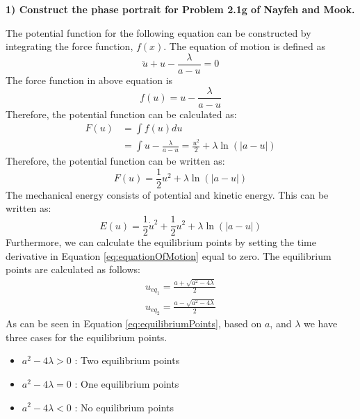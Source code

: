 \documentclass[12pt, a4paper]{extreport}
\begin{document}
\begin{flushleft}
{\large\textbf{1) Construct the phase portrait for Problem 2.1g of Nayfeh and Mook.}}
\end{flushleft}

The potential function for the following equation can be constructed by integrating the force function, $f(x)$. The equation of motion is defined as
%
\begin{equation}\label{eq:equationOfMotion}
	\ddot{u} + u - \frac{\lambda}{a - u} = 0
\end{equation}
%
The force function in above equation is
%
\begin{equation}
	f(u) = u - \frac{\lambda}{a - u}
\end{equation}
%
Therefore, the potential function can be calculated as:
%
\begin{subequations}
\begin{align*}
	F(u) &= \int f(u) du \\
		&= \int u - \frac{\lambda}{a - u} = \frac{u^2}{2} + \lambda \ln \left( |a - u| \right)
\end{align*}
\end{subequations}
%
Therefore, the potential function can be written as:
%
\begin{equation}
	F(u) = \frac{1}{2}u^2 + \lambda \ln \left( |a - u| \right)
\end{equation}
%
The mechanical energy consists of potential and kinetic energy. This can be written as:
%
\begin{equation}\label{eq:mechanicalEnergy}
	E(u) = \frac{1}{2} \dot{u}^2 + \frac{1}{2}u^2 + \lambda \ln \left( |a - u| \right)
\end{equation}
%
Furthermore, we can calculate the equilibrium points by setting the time derivative in Equation \eqref{eq:equationOfMotion} equal to zero. The equilibrium points are calculated as follows:
%
\begin{subequations}\label{eq:equilibriumPoints}
\begin{align}
	u_{eq_1} = \frac{a + \sqrt{a^2 - 4\lambda}}{2} \\
	u_{eq_2} = \frac{a - \sqrt{a^2 - 4\lambda}}{2}
\end{align}
\end{subequations}
%
As can be seen in Equation \eqref{eq:equilibriumPoints}, based on $a$, and $\lambda$ we have three cases for the equilibrium points.
%
\begin{itemize}
	\item $a^2 - 4\lambda > 0$ : Two equilibrium points
	\item $a^2 - 4\lambda = 0$ : One equilibrium points
	\item $a^2 - 4\lambda < 0$ : No equilibrium points
\end{itemize}
\end{document}
